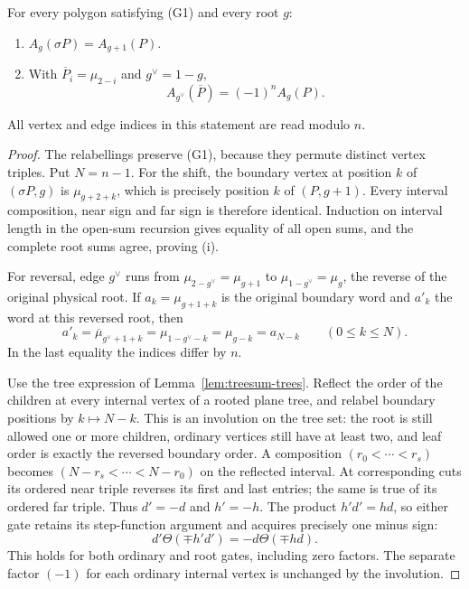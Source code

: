 \begin{proposition}\label{prop:A-reversal}\leanok
For every polygon satisfying (G1) and every root $g$:
\begin{enumerate}
\item[(i)] $A_g(\sigma P)=A_{g+1}(P)$.
\item[(ii)] With $\overline P_i=\mu_{2-i}$ and $g^\vee=1-g$,
\begin{equation}\label{arpr:reversal}
A_{g^\vee}(\overline P)=(-1)^nA_g(P).
\end{equation}
\end{enumerate}
All vertex and edge indices in this statement are read modulo $n$.

\end{proposition}
\begin{proof}\leanok{}
The relabellings preserve (G1), because they permute distinct vertex
triples. Put $N=n-1$. For the shift, the boundary vertex at position
$k$ of $(\sigma P,g)$ is $\mu_{g+2+k}$, which is precisely position
$k$ of $(P,g+1)$. Every interval composition, near sign and far sign
is therefore identical. Induction on interval length in the open-sum
recursion gives equality of all open sums, and the complete root sums
agree, proving (i).

For reversal, edge $g^\vee$ runs from
$\mu_{2-g^\vee}=\mu_{g+1}$ to
$\mu_{1-g^\vee}=\mu_g$, the reverse of the original physical root.
If $a_k=\mu_{g+1+k}$ is the original boundary word and $a'_k$ the
word at this reversed root, then
\begin{equation}\label{arpr:boundary}
a'_k=\overline\mu_{g^\vee+1+k}
     =\mu_{1-g^\vee-k}=\mu_{g-k}=a_{N-k}
\qquad(0\leq k\leq N).
\end{equation}
In the last equality the indices differ by $n$.

Use the tree expression of Lemma~\ref{lem:treesum-trees}.
Reflect the order of the children at every internal vertex of a
rooted plane tree, and relabel boundary positions by $k\mapsto N-k$.
This is an involution on the tree set: the root is still allowed one
or more children, ordinary vertices still have at least two, and leaf
order is exactly the reversed boundary order. A composition
$(r_0<\cdots<r_s)$ becomes
$(N-r_s<\cdots<N-r_0)$ on the reflected interval. At corresponding
cuts its ordered near triple reverses its first and last entries;
the same is true of its ordered far triple. Thus $d'=-d$ and $h'=-h$.
The product $h'd'=hd$, so either gate retains its step-function
argument and acquires precisely one minus sign:
\begin{equation}\label{arpr:gate}
d'\Theta(\mp h'd')=-d\Theta(\mp hd).
\end{equation}
This holds for both ordinary and root gates, including zero factors.
The separate factor $(-1)$ for each ordinary internal vertex is
unchanged by the involution.


\end{proof}
